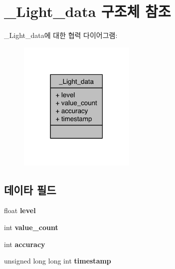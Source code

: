 \hypertarget{struct__Light__data}{\section{\-\_\-\-Light\-\_\-data 구조체 참조}
\label{struct__Light__data}
}


\-\_\-\-Light\-\_\-data에 대한 협력 다이어그램\-:\nopagebreak
\begin{figure}[H]
\begin{center}
\leavevmode
\includegraphics[width=158pt]{d9/de4/struct__Light__data__coll__graph}
\end{center}
\end{figure}
\subsection*{데이타 필드}
\begin{DoxyCompactItemize}
\item 
\hypertarget{struct__Light__data_a450c3ab9b94a4663caad892b7193b547}{float {\bfseries level}}\label{struct__Light__data_a450c3ab9b94a4663caad892b7193b547}

\item 
\hypertarget{struct__Light__data_a40a079bfc72408819dc78da308203a74}{int {\bfseries value\-\_\-count}}\label{struct__Light__data_a40a079bfc72408819dc78da308203a74}

\item 
\hypertarget{struct__Light__data_a5565cf9073275f9713f9016e7c10d25f}{int {\bfseries accuracy}}\label{struct__Light__data_a5565cf9073275f9713f9016e7c10d25f}

\item 
\hypertarget{struct__Light__data_a8de02c4128636a7bf630ff5428f60c8d}{unsigned long long int {\bfseries timestamp}}\label{struct__Light__data_a8de02c4128636a7bf630ff5428f60c8d}

\end{DoxyCompactItemize}


